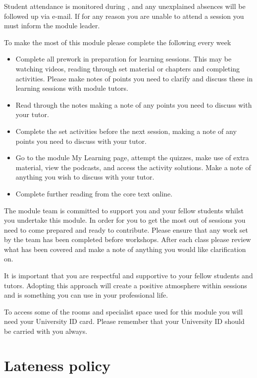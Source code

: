\documentclass{MDXHandbook}
\begin{document}
Student attendance is monitored during  , and any unexplained absences will be followed up via e-mail. If for any reason you are unable to attend a session you must inform the module leader.


To make the most of this module please complete the following every week
\begin{itemize}
\item Complete all prework in preparation for learning sessions. This may be watching videos, reading through set material or chapters and completing activities. Please make notes of points you need to clarify and discuss these in learning sessions with module tutors.
\item Read through the notes making a note of any points you need to discuss with your tutor.
\item Complete the set activities before the next session, making a note of any points you need to discuss with your tutor.
\item Go to the module My Learning page, attempt the quizzes, make use of extra material, view the podcasts, and access the activity solutions. Make a note of anything you wish to discuss with your tutor.
\item Complete further reading from the core text online.
\end{itemize}
The module team is committed to support you and your fellow students whilst you undertake this module. In order for you to get the most out of sessions you need to come prepared and ready to contribute. Please ensure that any work set by the team has been completed before workshops. After each class please review what has been covered and make a note of anything you would like clarification on. 

It is important that you are respectful and supportive to your fellow students and tutors. Adopting this approach will create a positive atmosphere within sessions and is something you can use in your professional life. 

To access some of the rooms and specialist space used for this module you will need your University ID card. Please remember that your University ID should be carried with you always.

\section*{Lateness policy}
\end{document}

